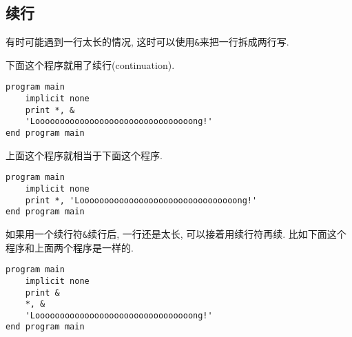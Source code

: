 \subsection{续行}

有时可能遇到一行太长的情况, 这时可以使用\texttt{\&{}}来把一行拆成两行写.

下面这个程序就用了续行(continuation).
\begin{lstlisting}
program main
    implicit none
    print *, &
    'Loooooooooooooooooooooooooooooooong!'
end program main
\end{lstlisting}
上面这个程序就相当于下面这个程序.
\begin{lstlisting}
program main
    implicit none
    print *, 'Loooooooooooooooooooooooooooooooong!'
end program main
\end{lstlisting}

如果用一个续行符\texttt{\&{}}续行后, 一行还是太长, 可以接着用续行符再续. 比如下面这个程序和上面两个程序是一样的.
\begin{lstlisting}
program main
    implicit none
    print &
    *, &
    'Loooooooooooooooooooooooooooooooong!'
end program main
\end{lstlisting}

